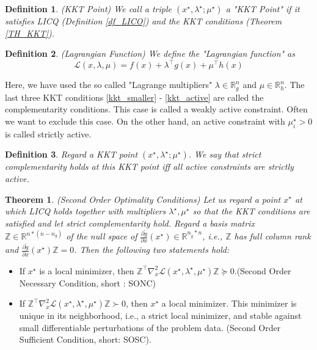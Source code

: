 \documentclass  [
  paper    = a4,
  BCOR     = 10mm,
  twoside,
  fontsize = 12pt,
  fleqn,
  toc      = bibnumbered,
  toc      = listofnumbered,
  numbers  = noendperiod,
  headings = normal,
  listof   = leveldown,
  version  = 3.03
]                                       {scrreprt}
\newcommand{\<}{\langle}
\renewcommand{\>}{\rangle}
\newtheorem{theorem}{Theorem}
\newtheorem{definition}{Definition}
\begin{document}
\begin{definition}(KKT Point)
	We call a triple $(x^\star, \lambda^\star; \mu^\star)$ a "KKT Point" if it satisfies LICQ (Definition \ref{df_LICO}) and the KKT conditions (Theorem \ref{TH_KKT}).
\end{definition}
\begin{definition}(Lagrangian Function)
	We define the "Lagrangian function" as
	\begin{equation}
		\mathcal{L}(x,\lambda, \mu) = f(x) + \lambda^\top g(x) +  \mu^\top h(x) 
		\label{eq_Lagrangian}
	\end{equation}
\end{definition}
Here, we have used the so called "Lagrange multipliers" $\lambda \in \mathbb{R}^n_g$ and $\mu \in \mathbb{R}^n_h$. 
The last three KKT conditions \ref{kkt_smaller} - \ref{kkt_active} are called the complementarity conditions. 
This case is called a weakly active constraint. Often we want to exclude this case. On the other hand, an active constraint with $\mu_i^\star > 0$ is called strictly active.
\begin{definition}
	Regard a KKT point $(x^\star, \lambda^\star; \mu^\star)$. We say that strict complementarity holds at this KKT point iff all	active constraints are strictly active.
\end{definition}

\begin{theorem}(Second Order Optimality Conditions) Let us regard a point $x^\star$ at which LICQ holds together with
	multipliers $\lambda^\star, \mu^\star$ so that the KKT conditions are satisfied and let strict complementarity hold. Regard a basis matrix $\mathbb{Z} \in  \mathbb{R}^{n*(n-n_g)}$ of the null space of $\frac{\partial \tilde{g}}{\partial x} (x^\star) \in \mathbb{R}^{n_{\tilde{g}} *n}$, i.e., $\mathbb{Z}$ has full column rank and $\frac{\partial \tilde{g}}{\partial x} (x^\star)\mathbb{Z} =0$. Then the following two statements hold:
\end{theorem}
\begin{itemize}
	\item  If $x^\star$ is a local minimizer, then $\mathbb{Z}^\top \nabla_x^2 \mathcal{L}(x^\star, \lambda^\star, \mu^\star)\mathbb{Z} \succeq 0  $.(Second Order Necessary Condition, short : SONC)
	\item  If $\mathbb{Z}^\top \nabla_x^2 \mathcal{L}(x^\star, \lambda^\star, \mu^\star)\mathbb{Z} \succ 0 $, then $x^\star$ a local minimizer. This minimizer is unique in its neighborhood, i.e., a strict local minimizer, and stable against small differentiable perturbations of the problem data. (Second Order Sufficient Condition, short: SOSC).
\end{itemize}
\end{document}
